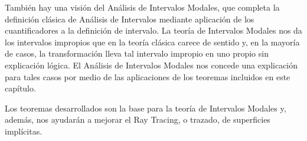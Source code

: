 También hay una visión del Análisis de Intervalos Modales, que completa la definición clásica de Análisis de Intervalos mediante aplicación de los cuantificadores a la definición de intervalo. La teoría de Intervalos Modales nos da los intervalos impropios que en la teoría clásica carece de sentido y, en la mayoría de casos, la transformación lleva tal intervalo impropio en uno propio sin explicación lógica. El Análisis de Intervalos Modales nos concede una explicación para tales casos por medio de las aplicaciones de los teoremas incluidos en este capítulo.

Los teoremas desarrollados son la base para la teoría de Intervalos Modales y, además, nos ayudarán a mejorar el Ray Tracing, o trazado, de superficies implícitas.